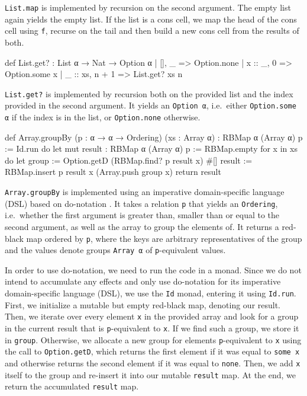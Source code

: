 \lstinline|List.map| is implemented by recursion on the second argument. The empty list again yields the empty list. If the list is a cons cell, we map the head of the cons cell using \lstinline|f|, recurse on the tail and then build a new cons cell from the results of both.\\
\begin{code}
def List.get? : List α → Nat → Option α
  | [],      _     => Option.none
  | x :: _,  0     => Option.some x
  | _ :: xs, n + 1 => List.get? xs n
\end{code}

\lstinline|List.get?| is implemented by recursion both on the provided list and the index provided in the second argument. It yields an \lstinline|Option α|, i.e.\ either \lstinline|Option.some α| if the index is in the list, or \lstinline|Option.none| otherwise.\\
\begin{code}
def Array.groupBy (p : α → α → Ordering) (xs : Array α)
  : RBMap α (Array α) p := Id.run do
  let mut result : RBMap α (Array α) p := RBMap.empty
  for x in xs do
    let group := Option.getD (RBMap.find? p result x) #[]
    result := RBMap.insert p result x (Array.push group x)
  return result
\end{code}

\lstinline|Array.groupBy| is implemented using an imperative domain-specific language (DSL) based on do-notation \citep{ullrich_beyond_2022}. It takes a relation \lstinline|p| that yields an \lstinline|Ordering|, i.e.\ whether the first argument is greater than, smaller than or equal to the second argument, as well as the array to group the elements of. It returns a red-black map ordered by \lstinline|p|, where the keys are arbitrary representatives of the group and the values denote groups \lstinline|Array α| of \lstinline|p|-equivalent values.

In order to use do-notation, we need to run the code in a monad. Since we do not intend to accumulate any effects and only use do-notation for its imperative domain-specific language (DSL), we use the \lstinline|Id| monad, entering it using \lstinline|Id.run|. First, we initialize a mutable but empty red-black map, denoting our result. Then, we iterate over every element \lstinline|x| in the provided array and look for a group in the current result that is \lstinline|p|-equivalent to \lstinline|x|. If we find such a group, we store it in \lstinline|group|. Otherwise, we allocate a new group for elements \lstinline|p|-equivalent to \lstinline|x| using the call to \lstinline|Option.getD|, which returns the first element if it was equal to \lstinline|some x| and otherwise returns the second element if it was equal to \lstinline|none|. Then, we add \lstinline|x| itself to the group and re-insert it into our mutable \lstinline|result| map. At the end, we return the accumulated \lstinline|result| map.

